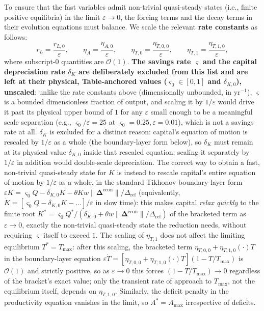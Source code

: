 \documentclass[twocolumn,10pt]{article}
\begin{document}
To ensure that the fast variables admit non-trivial quasi-steady states (i.e., finite positive equilibria) in the limit \(\varepsilon \to 0\), the forcing terms and the decay terms in their evolution equations must balance. We scale the relevant \textbf{rate constants} as follows:
\[
r_L = \frac{r_{L,0}}{\varepsilon},\qquad
\eta_A = \frac{\eta_{A,0}}{\varepsilon},\qquad
\eta_{T,0} = \frac{\eta_{T,0,0}}{\varepsilon},\qquad
\eta_{T,1} = \frac{\eta_{T,1,0}}{\varepsilon},
\]
where subscript-\(0\) quantities are \(\mathcal{O}(1)\). \textbf{The savings rate $\varsigma$ and the capital depreciation rate $\delta_K$ are deliberately excluded from this list and are left at their physical, Table-anchored values ($\varsigma_0\in[0,1]$ and $\delta_{K,0}$), unscaled}: unlike the rate constants above (dimensionally unbounded, in $\text{yr}^{-1}$), $\varsigma$ is a bounded dimensionless fraction of output, and scaling it by $1/\varepsilon$ would drive it past its physical upper bound of $1$ for any $\varepsilon$ small enough to be a meaningful scale separation (e.g., $\varsigma_0/\varepsilon=25$ at $\varsigma_0=0.25,\varepsilon=0.01$), which is not a savings rate at all. $\delta_K$ is excluded for a distinct reason: capital's equation of motion is rescaled by $1/\varepsilon$ as a whole (the boundary-layer form below), so $\delta_K$ must remain at its physical value $\delta_{K,0}$ inside that rescaled equation; scaling it separately by $1/\varepsilon$ in addition would double-scale depreciation. The correct way to obtain a fast, non-trivial quasi-steady state for $K$ is instead to rescale capital's entire equation of motion by $1/\varepsilon$ as a whole, in the standard Tikhonov boundary-layer form $\varepsilon\dot K = \varsigma_0 Q - \delta_{K,0}K - \theta K w\|\boldsymbol\Delta^{\text{econ}}\|/\Delta_{\text{ref}}$ (equivalently, $\dot K=[\varsigma_0 Q-\delta_{K,0}K-\ldots]/\varepsilon$ in slow time): this makes capital \emph{relax quickly} to the finite root $K^*=\varsigma_0 Q^*/(\delta_{K,0}+\theta w\|\boldsymbol\Delta^{\text{econ}}\|/\Delta_{\text{ref}})$ of the bracketed term as $\varepsilon\to0$, exactly the non-trivial quasi-steady state the reduction needs, without requiring $\varsigma$ itself to exceed $1$. The scaling of \(\eta_{T,1}\) does not affect the limiting equilibrium \(T^* = T_{\max}\): after this scaling, the bracketed term \(\eta_{T,0,0} + \eta_{T,1,0}(\cdot)T\) in the boundary-layer equation \(\varepsilon\dot T = [\eta_{T,0,0}+\eta_{T,1,0}(\cdot)T](1-T/T_{\max})\) is \(\mathcal{O}(1)\) and strictly positive, so as \(\varepsilon\to0\) this forces \((1-T/T_{\max})\to0\) regardless of the bracket's exact value; only the transient rate of approach to \(T_{\max}\), not the equilibrium itself, depends on \(\eta_{T,1,0}\). Similarly, the deficit penalty in the productivity equation vanishes in the limit, so \(A^* = A_{\max}\) irrespective of deficits.
\end{document}
